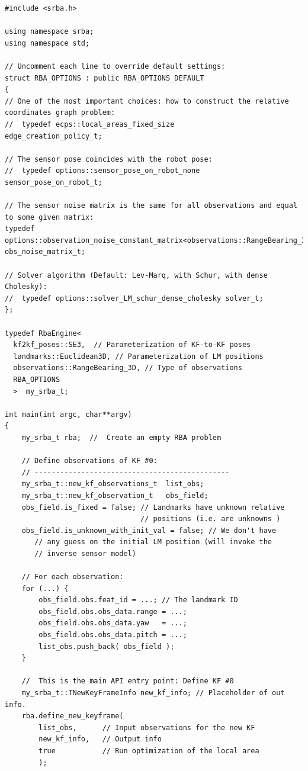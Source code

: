 \documentclass[a4paper,11pt]{article}
\begin{document}
\begin{lstlisting}
#include <srba.h>

using namespace srba;
using namespace std;

// Uncomment each line to override default settings:
struct RBA_OPTIONS : public RBA_OPTIONS_DEFAULT
{
// One of the most important choices: how to construct the relative coordinates graph problem:
//	typedef ecps::local_areas_fixed_size            edge_creation_policy_t;  

// The sensor pose coincides with the robot pose:
//	typedef options::sensor_pose_on_robot_none      sensor_pose_on_robot_t;  

// The sensor noise matrix is the same for all observations and equal to some given matrix:
typedef options::observation_noise_constant_matrix<observations::RangeBearing_3D>   obs_noise_matrix_t;      

// Solver algorithm (Default: Lev-Marq, with Schur, with dense Cholesky):
//	typedef options::solver_LM_schur_dense_cholesky solver_t;                
};

typedef RbaEngine<
  kf2kf_poses::SE3,  // Parameterization of KF-to-KF poses
  landmarks::Euclidean3D, // Parameterization of LM positions
  observations::RangeBearing_3D, // Type of observations
  RBA_OPTIONS
  >  my_srba_t;

int main(int argc, char**argv)
{
	my_srba_t rba;  //  Create an empty RBA problem
	
	// Define observations of KF #0:
	// ----------------------------------------------
	my_srba_t::new_kf_observations_t  list_obs;
	my_srba_t::new_kf_observation_t   obs_field;
	obs_field.is_fixed = false; // Landmarks have unknown relative 
	                            // positions (i.e. are unknowns )
	obs_field.is_unknown_with_init_val = false; // We don't have 
       // any guess on the initial LM position (will invoke the 
       // inverse sensor model)

	// For each observation:
	for (...) {
		obs_field.obs.feat_id = ...; // The landmark ID
		obs_field.obs.obs_data.range = ...;
		obs_field.obs.obs_data.yaw   = ...;
		obs_field.obs.obs_data.pitch = ...;
		list_obs.push_back( obs_field );
	}

	//  This is the main API entry point: Define KF #0
	my_srba_t::TNewKeyFrameInfo new_kf_info; // Placeholder of out info.
	rba.define_new_keyframe(
		list_obs,      // Input observations for the new KF
		new_kf_info,   // Output info
		true           // Run optimization of the local area
		);


\end{lstlisting}
\end{document}
